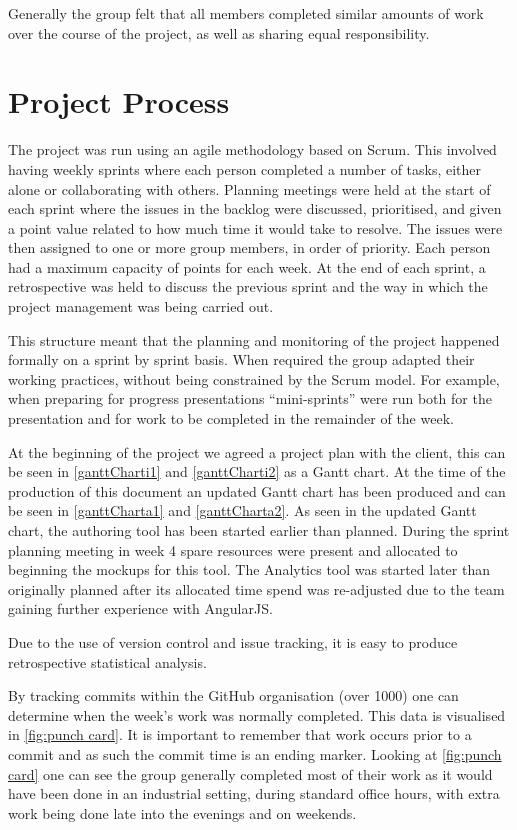 Generally the group felt that all members completed similar amounts of work over the course of the project, as well as sharing equal responsibility.

\section{Project Process}
\label{Section:Project Process}

The project was run using an agile methodology based on Scrum. This involved having weekly sprints where each person completed a number of tasks, either alone or collaborating with others. Planning meetings were held at the start of each sprint where the issues in the backlog were discussed, prioritised, and given a point value related to how much time it would take to resolve. The issues were then assigned to one or more group members, in order of priority. Each person had a maximum capacity of points for each week. At the end of each sprint, a retrospective was held to discuss the previous sprint and the way in which the project management was being carried out.

This structure meant that the planning and monitoring of the project happened formally on a sprint by sprint basis. When required the group adapted their working practices, without being constrained by the Scrum model. For example, when preparing for progress presentations ``mini-sprints'' were run both for the presentation and for work to be completed in the remainder of the week.

At the beginning of the project we agreed a project plan with the client, this can be seen in \autoref{ganttCharti1} and \autoref{ganttCharti2} as a Gantt chart. At the time of the production of this document an updated Gantt chart has been produced and can be seen in  \autoref{ganttCharta1} and \autoref{ganttCharta2}. As seen in the updated Gantt chart, the authoring tool has been started earlier than planned. During the sprint planning meeting in week 4 spare resources were present and allocated to beginning the mockups for this tool. The Analytics tool was started later than originally planned after its allocated time spend was re-adjusted due to the team gaining further experience with AngularJS.

Due to the use of version control and issue tracking, it is easy to produce retrospective statistical analysis.

By tracking commits within the GitHub organisation (over 1000) one can determine when the week's work was normally completed. This data is visualised in \autoref{fig:punch card}. It is important to remember that work occurs prior to a commit and as such the commit time is an ending marker. Looking at \autoref{fig:punch card} one can see the group generally completed most of their work as it would have been done in an industrial setting, during standard office hours, with extra work being done late into the evenings and on weekends.

